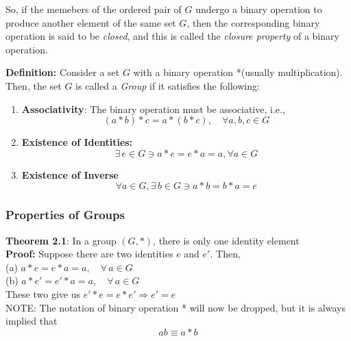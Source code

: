 \documentclass[a4paper, 12pt]{article}
\numberwithin{equation}{section}
\begin{document}
So, if the memebers of the ordered pair of $G$ undergo a binary operation to produce another element of the same set $G$, then the corresponding binary operation is said to be \textit{closed}, and this is called the \textit{closure property} of a binary operation.

\noindent
\textbf{Definition:} Consider a set $G$ with a binary operation *(usually multiplication). Then, the set $G$ is called a \textit{Group} if it satisfies the following:
\begin{enumerate}
 \item \textbf{Associativity}: The binary operation must be associative, i.e.,
 \begin{equation}
 (a * b) * c = a * (b * c), \quad \forall a,b,c \in G
 \end{equation}
 \item \textbf{Existence of Identities:}
 \begin{equation}
 \exists \,e \in G \ni a*e = e*a = a, \forall a \in G
 \end{equation}
 \item \textbf{Existence of Inverse}
 \begin{equation}
 \forall a \in G, \exists \,b \in G \ni a*b = b*a = e
 \end{equation}
\end{enumerate}

\subsubsection{Properties of Groups}
\textbf{Theorem 2.1}: In a group $(G, *)$, there is only one identity element\\
\textbf{Proof:} Suppose there are two identities $e$ and $e'$. Then,\\
(a) $a * e = e * a = a, \quad \forall \,a \in G$\\
(b) $a * e' = e' * a = a, \quad \forall \,a \in G$\\
These two give us $e' * e = e * e' \Rightarrow \boxed{e' = e}$\\

NOTE: The notation of binary operation * will now be dropped, but it is always implied that
\begin{equation}
ab \equiv a*b
\end{equation}
\end{document}
